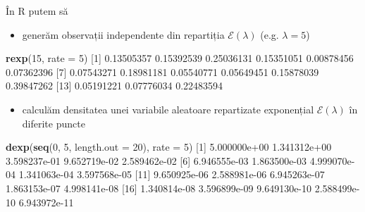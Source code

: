 \documentclass[]{article}
\newenvironment{Shaded}{\begin{snugshade}}{\end{snugshade}}
\newcommand{\KeywordTok}[1]{\textcolor[rgb]{0.13,0.29,0.53}{\textbf{#1}}}
\newcommand{\DataTypeTok}[1]{\textcolor[rgb]{0.13,0.29,0.53}{#1}}
\newcommand{\DecValTok}[1]{\textcolor[rgb]{0.00,0.00,0.81}{#1}}
\newcommand{\FloatTok}[1]{\textcolor[rgb]{0.00,0.00,0.81}{#1}}
\newcommand{\NormalTok}[1]{#1}
\providecommand{\tightlist}{%
  \setlength{\itemsep}{0pt}\setlength{\parskip}{0pt}}
\begin{document}
În R putem să

\begin{itemize}
\tightlist
\item
  generăm observații independente din repartiția
  \(\mathcal{E}(\lambda)\) (e.g. \(\lambda = 5\))
\end{itemize}

\begin{Shaded}
\begin{Highlighting}[]
\KeywordTok{rexp}\NormalTok{(}\DecValTok{15}\NormalTok{, }\DataTypeTok{rate =} \DecValTok{5}\NormalTok{)}
\NormalTok{ [}\DecValTok{1}\NormalTok{] }\FloatTok{0.13505357} \FloatTok{0.15392539} \FloatTok{0.25036131} \FloatTok{0.15351051} \FloatTok{0.00878456} \FloatTok{0.07362396}
\NormalTok{ [}\DecValTok{7}\NormalTok{] }\FloatTok{0.07543271} \FloatTok{0.18981181} \FloatTok{0.05540771} \FloatTok{0.05649451} \FloatTok{0.15878039} \FloatTok{0.39847262}
\NormalTok{[}\DecValTok{13}\NormalTok{] }\FloatTok{0.05191221} \FloatTok{0.07776034} \FloatTok{0.22483594}
\end{Highlighting}
\end{Shaded}

\begin{itemize}
\tightlist
\item
  calculăm densitatea unei variabile aleatoare repartizate exponențial
  \(\mathcal{E}(\lambda)\) în diferite puncte
\end{itemize}

\begin{Shaded}
\begin{Highlighting}[]
\KeywordTok{dexp}\NormalTok{(}\KeywordTok{seq}\NormalTok{(}\DecValTok{0}\NormalTok{, }\DecValTok{5}\NormalTok{, }\DataTypeTok{length.out =} \DecValTok{20}\NormalTok{), }\DataTypeTok{rate =} \DecValTok{5}\NormalTok{)}
\NormalTok{ [}\DecValTok{1}\NormalTok{] }\FloatTok{5.000000e+00} \FloatTok{1.341312e+00} \FloatTok{3.598237e-01} \FloatTok{9.652719e-02} \FloatTok{2.589462e-02}
\NormalTok{ [}\DecValTok{6}\NormalTok{] }\FloatTok{6.946555e-03} \FloatTok{1.863500e-03} \FloatTok{4.999070e-04} \FloatTok{1.341063e-04} \FloatTok{3.597568e-05}
\NormalTok{[}\DecValTok{11}\NormalTok{] }\FloatTok{9.650925e-06} \FloatTok{2.588981e-06} \FloatTok{6.945263e-07} \FloatTok{1.863153e-07} \FloatTok{4.998141e-08}
\NormalTok{[}\DecValTok{16}\NormalTok{] }\FloatTok{1.340814e-08} \FloatTok{3.596899e-09} \FloatTok{9.649130e-10} \FloatTok{2.588499e-10} \FloatTok{6.943972e-11}
\end{Highlighting}
\end{Shaded}
\end{document}
